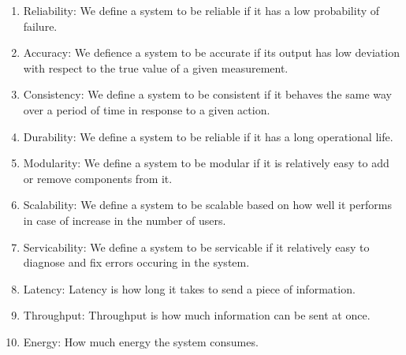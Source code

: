 \begin{enumerate}
	\item Reliability: We define a system to be reliable if it has a low probability of failure.
	\item Accuracy: We defience a system to be accurate if its output has low deviation with respect to the true value of a given measurement.
	\item Consistency: We define a system to be consistent if it behaves the same way over a period of time in response to a given action.
	\item Durability: We define a system to be reliable if it has a long operational life.
	\item Modularity: We define a system to be modular if it is relatively easy to add or remove components from it.
	\item Scalability: We define a system to be scalable based on how well it performs in case of increase in the number of users.
	\item Servicability: We define a system to be servicable if it relatively easy to diagnose and fix errors occuring in the system.
	\item Latency: Latency is how long it takes to send a piece of information.
	\item Throughput: Throughput is how much information can be sent at once.
	\item Energy: How much energy the system consumes.
\end{enumerate}


